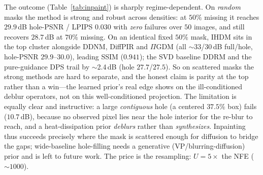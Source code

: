 \documentclass[11pt]{article}
\begin{document}
The outcome (Table~\ref{tab:inpaint}) is sharply regime-dependent. On \emph{random} masks the method is
strong and robust across densities: at $50\%$ missing it reaches $29.9$\,dB hole-PSNR / LPIPS $0.030$
with \emph{zero} failures over $50$ images, and still recovers $28.7$\,dB at $70\%$ missing. On an
identical fixed $50\%$ mask, IHDM sits in the top cluster alongside DDNM, DiffPIR and $\Pi$GDM (all
$\sim$33/30\,dB full/hole, hole-PSNR $29.9$--$30.0$), leading SSIM ($0.941$); the SVD baseline DDRM and
the pure-guidance DPS trail by $\sim$2.4\,dB (hole $27.7$/$27.5$). So on scattered masks the strong
methods are hard to separate, and the honest claim is parity at the top rather than a win---the
learned prior's real edge shows on the ill-conditioned deblur operators, not on this well-conditioned
projection. The limitation is equally clear and instructive: a
large \emph{contiguous} hole (a centered $37.5\%$ box) fails ($10.7$\,dB), because no observed pixel
lies near the hole interior for the re-blur to reach, and a heat-dissipation prior \emph{deblurs}
rather than \emph{synthesizes}. Inpainting thus succeeds precisely where the mask is scattered enough
for diffusion to bridge the gaps; wide-baseline hole-filling needs a generative (VP/blurring-diffusion)
prior and is left to future work. The price is the resampling: $U{=}5\times$ the NFE ($\sim\!1000$).
\end{document}
